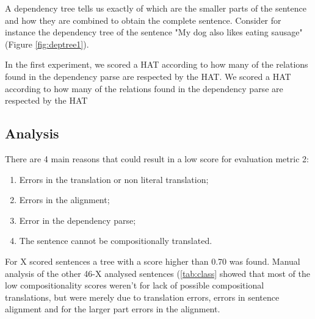 \documentclass{report}
\theoremstyle{definition}
\theoremstyle{plain}
\begin{document}
A dependency tree tells us exactly of which are the smaller parts of the sentence and how they are combined to obtain the complete sentence. Consider for instance the dependency tree of the sentence "My dog also likes eating sausage" (Figure \ref{fig:deptree1}).


In the first experiment, we scored a HAT according to how many of the relations found in the dependency parse are respected by the HAT.
We scored a HAT according to how many of the relations found in the dependency parse are respected by the HAT







\subsection{Analysis}

There are 4 main reasons that could result in a low score for evaluation metric 2:
\begin{enumerate}
\item Errors in the translation or non literal translation;
\item Errors in the alignment;
\item Error in the dependency parse;
\item The sentence cannot be compositionally translated.
\end{enumerate}

For X scored sentences a tree with a score higher than 0.70 was found. Manual analysis of the other 46-X analysed sentences (\ref{tab:class} showed that most of the low compositionality scores weren't for lack of possible compositional translations, but were merely due to translation errors, errors in sentence alignment and for the larger part errors in the alignment.
\end{document}
